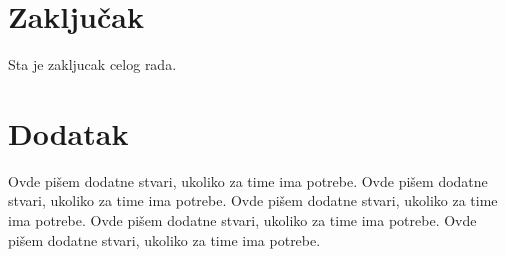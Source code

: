\documentclass[a4paper]{article}
\begin{document}
\section{Zaključak}
\label{sec:zakljucak}

Sta je zakljucak celog rada.

\appendix
 


\appendix
\section{Dodatak}
Ovde pišem dodatne stvari, ukoliko za time ima potrebe.
Ovde pišem dodatne stvari, ukoliko za time ima potrebe.
Ovde pišem dodatne stvari, ukoliko za time ima potrebe.
Ovde pišem dodatne stvari, ukoliko za time ima potrebe.
Ovde pišem dodatne stvari, ukoliko za time ima potrebe.
\end{document}
